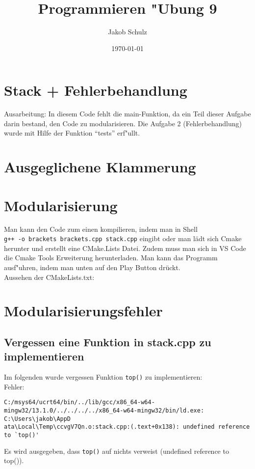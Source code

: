 \documentclass[a4paper,11pt,titlepage]{article}
\begin{document}
\title{Programmieren "Ubung 9}


\author{Jakob Schulz}


\date{\today}

\maketitle{\thispagestyle{plain}}

\section{Stack + Fehlerbehandlung}
Ausarbeitung:
In diesem Code fehlt die main-Funktion, da ein Teil dieser Aufgabe darin bestand, den Code zu modularisieren.
Die Aufgabe 2 (Fehlerbehandlung) wurde mit Hilfe der Funktion "`tests"' erf"ullt.
\newpage
{}
\section{Ausgeglichene Klammerung}
\newpage
\section{Modularisierung}

Man kann den Code zum einen kompilieren, indem man in Shell\\\verb?g++ -o brackets brackets.cpp stack.cpp? eingibt oder man lädt sich Cmake herunter und erstellt eine CMake.Lists Datei. Zudem muss man sich in VS Code die Cmake Tools Erweiterung herunterladen. Man kann das Programm ausf"uhren, indem man unten auf den Play Button drückt.\\
Aussehen der CMakeLists.txt:

\section{Modularisierungsfehler}
\subsection{Vergessen eine Funktion in stack.cpp zu implementieren}
Im folgenden wurde vergessen Funktion \verb+top()+ zu implementieren:\\
Fehler:
\begin{verbatim}
C:/msys64/ucrt64/bin/../lib/gcc/x86_64-w64-mingw32/13.1.0/../../../../x86_64-w64-mingw32/bin/ld.exe: C:\Users\jakob\AppD
ata\Local\Temp\ccvgV7Qn.o:stack.cpp:(.text+0x138): undefined reference to `top()'
\end{verbatim}
Es wird ausgegeben, dass \verb+top()+ auf nichts verweist (undefined reference to top()).
\end{document}
